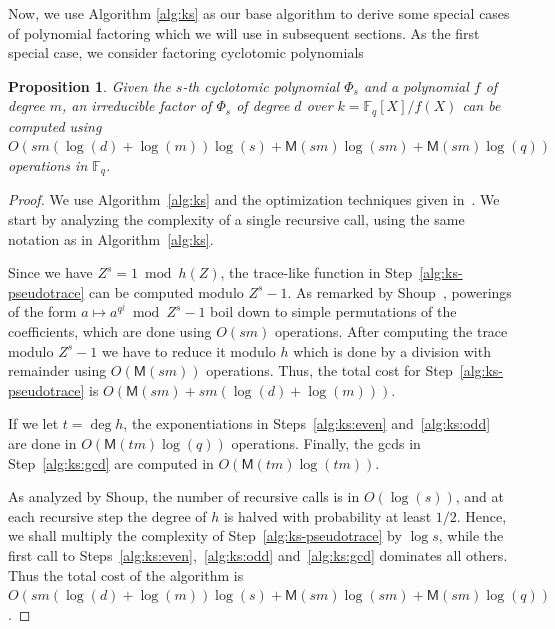 \documentclass[12pt]{article}
\theoremstyle{plain}
\newtheorem{proposition}[theorem]{Proposition}
\theoremstyle{definition}
\def\F{\ensuremath{\mathbb{F}}}
\def\MM{\ensuremath{\mathsf{M}}}
\newcounter{algorithm}
\begin{document}
Now, we use Algorithm \ref{alg:ks} as our base algorithm to derive some
special cases of polynomial factoring which we will use in subsequent sections.
As the first special case, we consider factoring cyclotomic polynomials


\begin{proposition}
  \label{prop:cyclo}
  Given the $s$-th cyclotomic polynomial $\Phi_s$ and a polynomial $f$ of degree $m$,
  an irreducible factor of $\Phi_s$ of degree $d$ over $k=\F_q[X]/f(X)$ 
  can be computed using $O(sm(\log(d)+\log(m))\log(s) + \MM(sm)\log(sm) + 
  \MM(sm)\log(q))$ operations in $\F_q$.
\end{proposition}
\begin{proof}
  We use Algorithm~\ref{alg:ks} and the optimization techniques given
  in~\cite{shoup94}. We start by analyzing the complexity of a single
  recursive call, using the same notation as in
  Algorithm~\ref{alg:ks}.

  Since we have $Z^s = 1\bmod h(Z)$, the trace-like function in
  Step~\ref{alg:ks-pseudotrace} can be computed modulo $Z^s - 1$. As
  remarked by Shoup~\cite{shoup94}, powerings of the form
  $a\mapsto a^{q^j} \bmod Z^s-1$ boil down to simple permutations of
  the coefficients, which are done using $O(sm)$ operations. After
  computing the trace modulo $Z^s - 1$ we have to reduce it modulo $h$
  which is done by a division with remainder using $O(\MM(sm))$
  operations.  Thus, the total cost for Step~\ref{alg:ks-pseudotrace}
  is $O(\MM(sm) + sm(\log(d)+\log(m)))$.

  If we let $t=\deg h$, the exponentiations in Steps~\ref{alg:ks:even}
  and~\ref{alg:ks:odd} are done in $O(\MM(tm)\log(q))$
  operations. Finally, the gcds in Step~\ref{alg:ks:gcd} are computed
  in $O(\MM(tm)\log(tm))$.

  As analyzed by Shoup, the number of recursive calls is in
  $O(\log(s))$, and at each recursive step the degree of $h$ is halved
  with probability at least $1/2$. Hence, we shall multiply the
  complexity of Step~\ref{alg:ks-pseudotrace} by
  $\log s$, while the first call to Steps~\ref{alg:ks:even},~\ref{alg:ks:odd}
  and~\ref{alg:ks:gcd} dominates all others. Thus the total cost of the algorithm is
  $O(sm(\log(d)+\log(m))\log(s) + \MM(sm)\log(sm) + \MM(sm)\log(q))$.
\end{proof}
\end{document}
